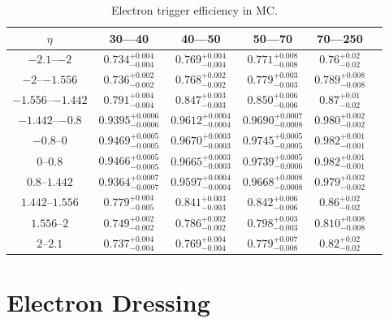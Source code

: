 \begin{table}[h]
\begin{center}
    \begin{tabular}{ | c | c | c | c | c | c |} \hline
	$\eta$ & 30---40 \GeV & 40---50 \GeV & 50---70 \GeV & 70---250 \GeV  \\ \hline
	$\numrange{-2.1}{-2}$ & $0.734^{+0.004}_{-0.004}$ & $0.769^{+0.004}_{-0.004}$ & $0.771^{+0.008}_{-0.008}$ & $0.76^{+0.02}_{-0.02}$  \\ \hline
	$\numrange{-2}{-1.556}$ & $0.736^{+0.002}_{-0.002}$ & $0.768^{+0.002}_{-0.002}$ & $0.779^{+0.003}_{-0.003}$ & $0.789^{+0.008}_{-0.008}$  \\ \hline
	$\numrange{-1.556}{-1.442}$ & $0.791^{+0.004}_{-0.004}$ & $0.847^{+0.003}_{-0.003}$ & $0.850^{+0.006}_{-0.006}$ & $0.87^{+0.01}_{-0.02}$  \\ \hline
	$\numrange{-1.442}{-0.8}$ & $0.9395^{+0.0006}_{-0.0006}$ & $0.9612^{+0.0004}_{-0.0004}$ & $0.9690^{+0.0007}_{-0.0008}$ & $0.980^{+0.002}_{-0.002}$  \\ \hline
	$\numrange{-0.8}{0}$ & $0.9469^{+0.0005}_{-0.0005}$ & $0.9670^{+0.0003}_{-0.0003}$ & $0.9745^{+0.0005}_{-0.0005}$ & $0.982^{+0.001}_{-0.001}$  \\ \hline
	$\numrange{0}{0.8}$ & $0.9466^{+0.0005}_{-0.0005}$ & $0.9665^{+0.0003}_{-0.0003}$ & $0.9739^{+0.0005}_{-0.0006}$ & $0.982^{+0.001}_{-0.001}$  \\ \hline
	$\numrange{0.8}{1.442}$ & $0.9364^{+0.0007}_{-0.0007}$ & $0.9597^{+0.0004}_{-0.0004}$ & $0.9668^{+0.0008}_{-0.0008}$ & $0.979^{+0.002}_{-0.002}$  \\ \hline
	$\numrange{1.442}{1.556}$ & $0.779^{+0.004}_{-0.005}$ & $0.841^{+0.003}_{-0.003}$ & $0.842^{+0.006}_{-0.006}$ & $0.86^{+0.02}_{-0.02}$  \\ \hline
	$\numrange{1.556}{2}$ & $0.749^{+0.002}_{-0.002}$ & $0.786^{+0.002}_{-0.002}$ & $0.798^{+0.003}_{-0.003}$ & $0.810^{+0.008}_{-0.008}$  \\ \hline
	$\numrange{2}{2.1}$ & $0.737^{+0.004}_{-0.004}$ & $0.769^{+0.004}_{-0.004}$ & $0.779^{+0.007}_{-0.008}$ & $0.82^{+0.02}_{-0.02}$  \\ \hline
    \end{tabular}
\end{center}
\centering
\caption{
    Electron trigger efficiency in \MADGRAPH MC.
}
\label{trigger_eff_mc}
\end{table}

\section{Electron Dressing}
\label{sec:electron_dressing}

